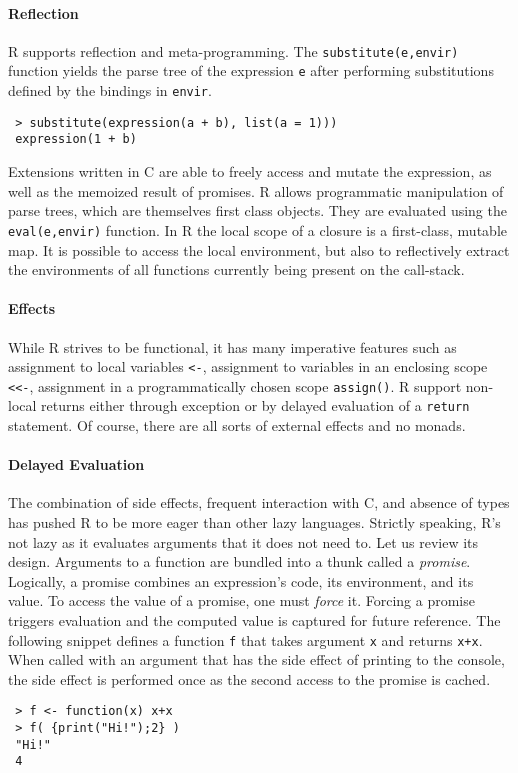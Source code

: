 \documentclass[review,nonacm,screen,acmsmall,anonymous=true]{acmart}
\newcommand{\authorcomment}[3]{}
\newcommand{\SK}[1]{\authorcomment{yellow}{SK}{#1}}
\newcommand{\code}[1]{\lstinline |#1|\xspace}
\begin{document}
\paragraph{Reflection}
R supports reflection and meta-programming. The \code{substitute(e,envir)}
function yields the parse tree of the expression \code{e} after performing
substitutions defined by the bindings in \code{envir}.
\vspace{-1mm}
\begin{lstlisting}
 > substitute(expression(a + b), list(a = 1)))
 expression(1 + b)
\end{lstlisting}
\noindent
Extensions written in C are able to freely access and mutate the expression, as
well as the memoized result of promises. R allows
programmatic manipulation of parse trees, which are themselves first class
objects. They are evaluated using the \code{eval(e,envir)} function.
In R the local scope of a closure is a first-class, mutable map.
It is possible to access the local environment, but also to reflectively extract the environments of all
functions currently being present on the call-stack.

\paragraph{Effects} While R strives to be functional, it has many imperative
features such as assignment to local variables \code{<-}, assignment to
variables in an enclosing scope \code{<<-}, assignment in a programmatically
chosen scope \code{assign()}. R support non-local returns either through
exception or by delayed evaluation of a \code{return} statement. Of course,
there are all sorts of external effects and no monads.

\paragraph{Delayed Evaluation}

The combination of side effects, frequent interaction with C, and absence of
types has pushed R to be more eager than other lazy languages. Strictly
speaking, R's not lazy as it evaluates arguments that it does not need to.\SK{I didn't understand previous sentence}  Let
us review its design. Arguments to a function are bundled into a thunk called a
\emph{promise}. Logically, a promise combines an expression's code, its
environment, and its value. To access the value of a promise, one must
\emph{force} it. Forcing a promise triggers evaluation and the computed value is
captured for future reference. The following snippet defines a function \code{f}
that takes argument \code x and returns \code{x+x}. When called with an argument
that has the side effect of printing to the console, the side effect is
performed once as the second access to the promise is cached.
\begin{lstlisting}
 > f <- function(x) x+x
 > f( {print("Hi!");2} )
 "Hi!"
 4
\end{lstlisting}
\end{document}
